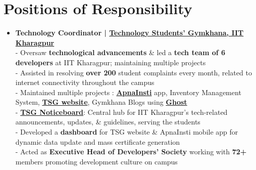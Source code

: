 \documentclass[a4paper,10pt]{extarticle} %
\begin{document}
\vspace{-0.1cm}
 \section{\textcolor{primary}{Positions of Responsibility}}
\vspace{+0.2cm}

\begin{itemize}[leftmargin=0.55cm, rightmargin=0.2cm, label={\Large\textbullet}]

\item \textbf{Technology Coordinator | \href{https://gymkhana.iitkgp.ac.in/}{Technology Students' Gymkhana, IIT Kharagpur}}\\
- Oversaw \textbf{technological advancements} \& led a \textbf{tech team of 6 developers} at IIT Kharagpur; maintaining multiple projects \\
- Assisted in resolving \textbf{over 200} student complaints every month, related to internet connectivity throughout the campus \\
- Maintained multiple projects : \href{https://play.google.com/store/apps/details?id=com.apnainsti&pli=1}{\textbf{ApnaInsti}} app, Inventory Management System, \href{https://gymkhana.iitkgp.ac.in/}{\textbf{TSG website}}, Gymkhana Blogs using \href{https://ghost.org/}{\textbf{Ghost}} \\
- \href{https://github.com/tsg-iitkgp/noticeboard}{\textbf{TSG Noticeboard}}: Central hub for IIT Kharagpur's tech-related announcements, updates, \& guidelines, serving the students \\
- Developed a \textbf{dashboard} for TSG website \& ApnaInsti mobile app for dynamic data update and mass certificate generation \\
- Acted as \textbf{Executive Head of Developers' Society} working with \textbf{72+} members promoting development culture on campus


\end{itemize}
\end{document}
